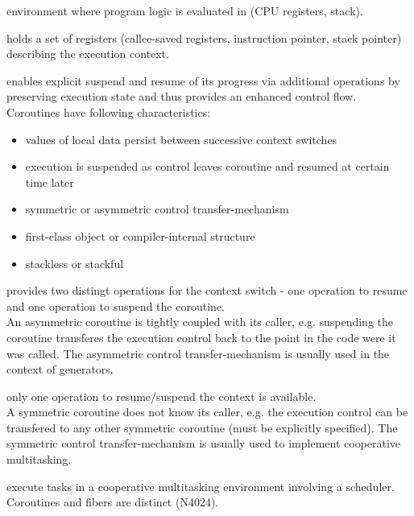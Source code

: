 
environment where program logic is evaluated in (CPU registers, stack).

holds a set of registers (callee-saved registers, instruction pointer, stack
pointer) describing the execution context.

enables explicit suspend and resume of its progress via additional operations by
preserving execution state and thus provides an enhanced control flow.
Coroutines have following characteristics\cite{N3985}:
\begin{itemize}
    \item values of local data persist between successive context switches
    \item execution is suspended as control leaves coroutine and resumed at
          certain time later
    \item symmetric or asymmetric control transfer-mechanism
    \item first-class object or compiler-internal structure
    \item stackless or stackful
\end{itemize}

provides two distingt operations for the context switch - one operation to
resume and one operation to suspend the coroutine.\\
An asymmetric coroutine is tightly coupled with its caller, e.g. suspending the
coroutine transferes the execution control back to the point in the code were it
was called. The asymmetric control transfer-mechanism is usually used in the
context of generators.

only one operation to resume/suspend the context is available.\\
A symmetric coroutine does not know its caller, e.g. the execution control can
be transfered to any other symmetric coroutine (must be explicitly specified).
The symmetric control transfer-mechanism is usually used to implement
cooperative multitasking.

execute tasks in a cooperative multitasking environment involving a scheduler.
Coroutines and fibers are distinct (N4024\cite{N4024}).

